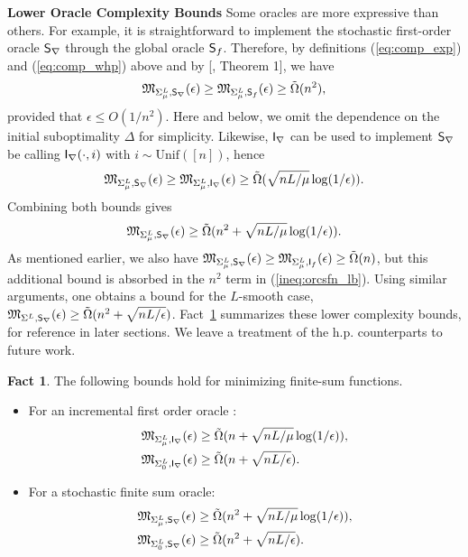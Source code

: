 \documentclass{article}
\theoremstyle{definition}  \newtheorem{exercise}{Exercise}
\newtheorem{fact}{Fact}
\theoremstyle{plain}
\newcommand{\strcvx}{\mu} \newcommand{\query}{B}
\theoremstyle{definition}
\theoremstyle{remark}
\newcommand{\Cite}[2]{[\cite{#1},#2]}
\begin{document}
	\textbf{Lower Oracle Complexity Bounds\quad} Some oracles are 
	more 
	expressive 
	than others. For example, it is straightforward to implement the 
	stochastic first-order oracle $\mathsf{S}_{\nabla}$ through the global oracle $\mathsf{S}_{f}$. 
	Therefore, by definitions (\ref{eq:comp_exp}) and (\ref{eq:comp_whp}) above 
	and by	\Cite{arjevani2017limitations}{ Theorem 1}, we 	have 
	\begin{align}
	\comp_{\fsmlL,\orcsfn}(\epsilon)\ge 
	\comp_{\fsmlL,\orcsg}(\epsilon)\ge \tilde{\Omega}(n^2),
	\end{align}
	provided that $\epsilon\le O(1/n^2)$. Here and below, we omit the dependence 
	on the initial suboptimality $\Delta$ for simplicity. Likewise, $\mathsf{I}_{\nabla}$ 
	can be used to 
	implement 
	$\mathsf{S}_{\nabla}$ be calling $\mathsf{I}_{\nabla}(\cdot,i)$ with $i\sim\text{Unif}([n])$, hence 
	\begin{align}
	\comp_{\fsmlL,\orcsfn}(\epsilon)\ge \comp_{\fsmlL,\orcifn}(\epsilon)\ge 
	\tilde{\Omega}(\sqrt{nL/\strcvx}\log(1/\epsilon)).
	\end{align}
	Combining both bounds gives
	\begin{align}\label{ineq:orcsfn_lb}
	\comp_{\fsmlL,\orcsfn}(\epsilon)\ge 	\tilde{\Omega}(
	n^2+\sqrt{nL/\strcvx}\log(1/\epsilon)).
	\end{align}
	As mentioned earlier, we also have 
	$\comp_{\fsmlL,\orcsfn}(\epsilon)\ge 
	\comp_{\fsmlL,\orcign}(\epsilon)\ge \tilde{\Omega}(n)$, but this additional 
	bound is absorbed in the $n^2$ term in (\ref{ineq:orcsfn_lb}). Using 
	similar arguments, one obtains a bound for the $L$-smooth case, 
	$\mathfrak{M}_{\Sigma^L,\mathsf{S}_{\nabla}}(\epsilon)\ge 	
	\tilde{\Omega}(n^2+\sqrt{nL/\epsilon})$. Fact~\ref{fact} summarizes these  lower complexity bounds, for reference in later sections. 
	We leave a treatment of the h.p. counterparts to future work.
	\begin{fact}\label{fact}
	The following bounds hold for minimizing finite-sum functions.
	\begin{itemize}[leftmargin=1em]
	    \item For an incremental first order oracle 
	    \cite{woodworth2016tight,arjevani2016dimension}:  
	    \begin{align}
		    \comp_{\fsmlL,\orcifn}(\epsilon) &\ge 
		    \tilde{\Omega}(n+\sqrt{nL/\strcvx}\log(1/\epsilon)),\\
		    \comp_{\Sigma_{0}^{L},\orcifn}(\epsilon) &\ge 
		    \tilde{\Omega}(n+\sqrt{nL/\epsilon}).
	    \end{align}
	   \item For a stochastic finite sum oracle:
	  \begin{align}
	  	 \comp_{\fsmlL,\orcsfn}(\epsilon) &\ge 
	  	 \label{eq:lb_n2_fs_sc}
	  	 \tilde{\Omega}(n^2+\sqrt{nL/\strcvx}\log(1/\epsilon)),\\
	  	\comp_{\Sigma_{0}^{L},\orcsfn}(\epsilon) &\ge 
	  	\tilde{\Omega}(n^2+\sqrt{nL/\epsilon}).\label{eq:lb_n2_fs_nsc}
	  \end{align}
	\end{itemize}
	\end{fact}
	
\end{document}
